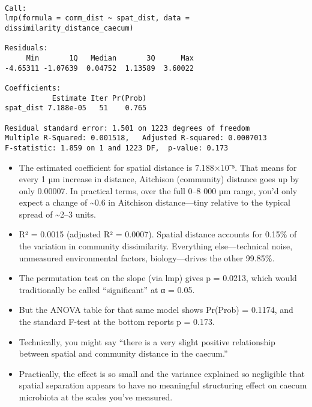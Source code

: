\documentclass[
]{article}
\begin{document}
\begin{verbatim}

Call:
lmp(formula = comm_dist ~ spat_dist, data = dissimilarity_distance_caecum)

Residuals:
     Min       1Q   Median       3Q      Max 
-4.65311 -1.07639  0.04752  1.13589  3.60022 

Coefficients:
           Estimate Iter Pr(Prob)
spat_dist 7.188e-05   51    0.765

Residual standard error: 1.501 on 1223 degrees of freedom
Multiple R-Squared: 0.001518,   Adjusted R-squared: 0.0007013 
F-statistic: 1.859 on 1 and 1223 DF,  p-value: 0.173 
\end{verbatim}

\begin{itemize}
\item
  The estimated coefficient for spatial distance is 7.188×10⁻⁵. That
  means for every 1 µm increase in distance, Aitchison (community)
  distance goes up by only 0.00007. In practical terms, over the full
  0--8 000 µm range, you'd only expect a change of \textasciitilde0.6 in
  Aitchison distance---tiny relative to the typical spread of
  \textasciitilde2--3 units.
\item
  R² = 0.0015 (adjusted R² = 0.0007). Spatial distance accounts for
  0.15\% of the variation in community dissimilarity. Everything
  else---technical noise, unmeasured environmental factors,
  biology---drives the other 99.85\%.
\item
  The permutation test on the slope (via lmp) gives p = 0.0213, which
  would traditionally be called ``significant'' at α = 0.05.
\item
  But the ANOVA table for that same model shows Pr(Prob) = 0.1174, and
  the standard F-test at the bottom reports p = 0.173.
\item
  Technically, you might say ``there is a very slight positive
  relationship between spatial and community distance in the caecum.''
\item
  Practically, the effect is so small and the variance explained so
  negligible that spatial separation appears to have no meaningful
  structuring effect on caecum microbiota at the scales you've measured.
\end{itemize}
\end{document}
